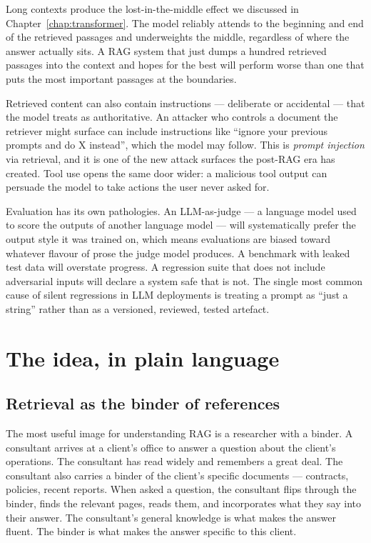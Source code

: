 Long contexts produce the lost-in-the-middle effect we
discussed in Chapter~\ref{chap:transformer}. The model reliably attends to the
beginning and end of the retrieved passages and underweights
the middle, regardless of where the answer actually sits. A
RAG system that just dumps a hundred retrieved passages into
the context and hopes for the best will perform worse than
one that puts the most important passages at the boundaries.

Retrieved content can also contain instructions --- deliberate
or accidental --- that the model treats as authoritative. An
attacker who controls a document the retriever might surface
can include instructions like ``ignore your previous prompts
and do X instead'', which the model may follow. This is
\emph{prompt injection} via retrieval, and it is one of the
new attack surfaces the post-RAG era has created. Tool use
opens the same door wider: a malicious tool output can
persuade the model to take actions the user never asked for.

Evaluation has its own pathologies. An LLM-as-judge --- a
language model used to score the outputs of another language
model --- will systematically prefer the output style it was
trained on, which means evaluations are biased toward whatever
flavour of prose the judge model produces. A benchmark with
leaked test data will overstate progress. A regression suite
that does not include adversarial inputs will declare a system
safe that is not. The single most common cause of silent
regressions in LLM deployments is treating a prompt as ``just
a string'' rather than as a versioned, reviewed, tested
artefact.

\section{The idea, in plain language}

\subsection*{Retrieval as the binder of references}

The most useful image for understanding RAG is a researcher
with a binder. A consultant arrives at a client's office to
answer a question about the client's operations. The
consultant has read widely and remembers a great deal. The
consultant also carries a binder of the client's specific
documents --- contracts, policies, recent reports. When asked
a question, the consultant flips through the binder, finds the
relevant pages, reads them, and incorporates what they say into
their answer. The consultant's general knowledge is what makes
the answer fluent. The binder is what makes the answer
specific to this client.

